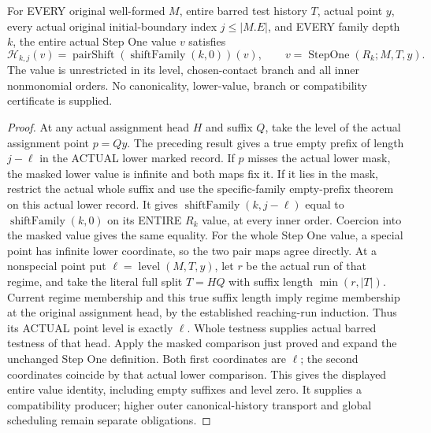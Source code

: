 \begin{theorem}
\label{hir:original-initial-boundary-entire-step-history-map-compatibility}
\leanok
For EVERY original well-formed $M$, entire barred test history $T$, actual
point $y$, every actual original initial-boundary index $j\leq |M.E|$,
and EVERY family depth $k$, the entire actual Step One value $v$ satisfies
\[
 \mathcal H_{k,j}(v)=\operatorname{pairShift}(\operatorname{shiftFamily}(k,0))(v),
 \qquad v=\operatorname{StepOne}(R_k;M,T,y).
\]
The value is unrestricted in its level, chosen-contact branch and all inner
nonmonomial orders. No canonicality, lower-value, branch or compatibility
certificate is supplied.
\end{theorem}
\begin{proof}
At any actual assignment head $H$ and suffix $Q$, take the level of the
actual assignment point $p=Qy$. The preceding result gives a true empty
prefix of length $j-\ell$ in the ACTUAL lower marked record. If $p$ misses
the actual lower mask, the masked lower value is infinite and both maps
fix it. If it lies in the mask, restrict the actual whole suffix and use
the specific-family empty-prefix theorem on this actual lower record.
It gives $\operatorname{shiftFamily}(k,j-\ell)$ equal to
$\operatorname{shiftFamily}(k,0)$ on its ENTIRE $R_k$ value, at every inner
order. Coercion into the masked value gives the same equality.
For the whole Step One value, a special point has infinite lower coordinate,
so the two pair maps agree directly. At a nonspecial point put
$\ell=\operatorname{level}(M,T,y)$, let $r$ be the actual run of that regime,
and take the literal full split $T=H Q$ with suffix length $\min(r,|T|)$.
Current regime membership and this true suffix length imply regime membership
at the original assignment head, by the established reaching-run induction.
Thus its ACTUAL point level is exactly $\ell$. Whole testness supplies actual
barred testness of that head. Apply the masked comparison just proved and
expand the unchanged Step One definition. Both first coordinates are $\ell$;
the second coordinates coincide by that actual lower comparison. This gives
the displayed entire value identity, including empty suffixes and level zero.
It supplies a compatibility producer; higher outer canonical-history transport
and global scheduling remain separate obligations.
\end{proof}
